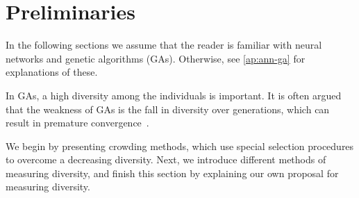 \section{Preliminaries}
\label{sec:preliminaries}

In the following sections we assume that the reader is familiar with neural networks and genetic algorithms (GAs). Otherwise, see \cref{ap:ann-ga} for explanations of these. 

In GAs, a high diversity among the individuals is important. It is often argued that the weakness of GAs is the fall in diversity over generations, which can result in premature convergence~\cite{diaz2007empirical, 1266373,Zitzler00comparisonof}.

We begin by presenting crowding methods, which use special selection procedures to overcome a decreasing diversity. Next, we introduce different methods of measuring diversity, and finish this section by explaining our own proposal for measuring diversity.





